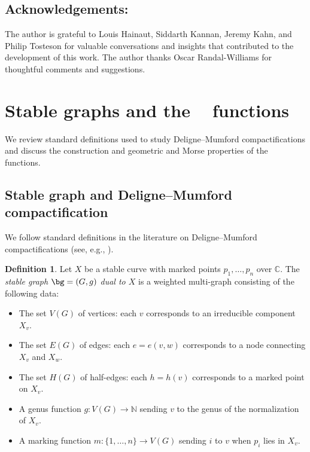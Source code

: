 \documentclass[12pt]{amsart}
\theoremstyle{remark}
\theoremstyle{definition}
\newtheorem{definition}[theorem]{Definition}
\DeclareMathOperator{\syst}{sys_T}
\numberwithin{equation}{section}
\begin{document}
\subsection{Acknowledgements:}
The author is grateful to Louis Hainaut, Siddarth Kannan, Jeremy Kahn, and Philip Tosteson for valuable conversations and insights that contributed to the development of this work. The author thanks Oscar Randal-Williams for thoughtful comments and suggestions.




\section{Stable graphs and the $\syst$ functions}
\label{sec:stable-graphs}

We review standard definitions used to study Deligne--Mumford compactifications and discuss the construction and geometric and Morse properties of the $\syst$ functions.

\subsection{Stable graph and Deligne--Mumford compactification}

We follow standard definitions in the literature on Deligne--Mumford compactifications (see, e.g., \cite{deligne1969irreducibility,chan2021moduli}).

\begin{definition}
Let $X$ be a stable curve with marked points $p_1,\dots, p_n$ over $\mathbb{C}$. The \emph{stable graph $\bg=(G,g)$ dual to $X$} is a weighted multi-graph consisting of the following data:

\begin{itemize}
    \item The set $V(G)$ of vertices: each $v$ corresponds to an irreducible component $X_v$.
    \item The set $E(G)$ of edges: each $e=e(v,w)$ corresponds to a node connecting $X_v$ and $X_w$.
    \item The set $H(G)$ of half-edges: each $h=h(v)$ corresponds to a marked point on $X_v$.
    \item A genus function $g\colon V(G) \to \mathbb N$ sending $v$ to the genus of the normalization of $X_v$.
    \item A marking function $m\colon \{1,\dots,n\}\to V(G)$ sending $i$ to $v$ when $p_i$ lies in $X_v$.
\end{itemize}
\end{definition}
\end{document}
